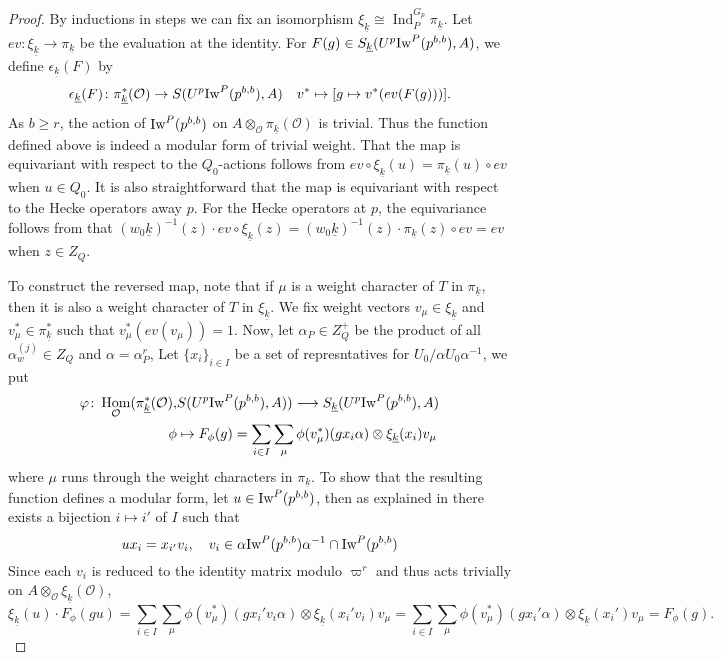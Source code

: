 \documentclass[leqno]{amsart}
\theoremstyle{definition}
\theoremstyle{remark}
\newcommand{\oo}{\mathcal{O}}
\DeclareMathOperator{\Hom}{Hom}
\DeclareMathOperator{\Ind}{Ind}
\newcommand{\wt}[1]{\underline{ #1 }}
\newcommand{\Iw}{\textnormal{Iw}} %
\begin{document}
\begin{proof}
	By inductions in steps
	we can fix an isomorphism 
	$\xi_{\wt{k}}\cong \Ind_{P}^{G_p}\pi_{\wt{k}}$.
	Let $ev\colon \xi_{\wt{k}}\to \pi_{\wt{k}}$
	be the evaluation at the identity.
	For $F(g)\in S_{\wt{k}}(U^p\Iw^P(p^{b,b}),A)$,
	we define 
	$\epsilon_{\wt{k}}(F)$ by
	\begin{equation}\label{eq:wt_indep}
	\epsilon_{\wt{k}}(F)\colon 
	\pi^*_{\wt{k}}(\oo)\rightarrow
	S(U^p\Iw^P(p^{b,b}),A)\quad
	v^*\mapsto [g\mapsto v^*(ev(F(g)))].
	\end{equation}
    As $b\geq r$,
	the action of $\Iw^P(p^{b,b})$ on 
	$A\otimes_{\oo}\pi_{\wt{k}}(\oo)$
	is trivial.
	Thus the function defined above is indeed 
	a modular form
	of trivial weight.
	That the map is equivariant with respect
    to the $Q_0$-actions
    follows from $ev\circ \xi_{\wt{k}}(u)=\pi_{\wt{k}}(u)\circ ev$
    when $u\in Q_0$.
    It is also straightforward that the map
    is equivariant with respect to the Hecke operators away $p$.
	For the Hecke operators at $p$,
    the equivariance follows from that 
    $(w_0\wt{k})^{-1}(z)\cdot ev\circ \xi_{\wt{k}}(z)=
    (w_0\wt{k})^{-1}(z)\cdot \pi_{\wt{k}}(z)\circ ev=
    ev$ when $z\in Z_Q$.


	To construct the reversed map,
	note that if $\mu$ is a weight character of $T$ in  
	$\pi_{\wt{k}}$, then it is also a weight character 
	of $T$ in $\xi_{\wt{k}}$.
	We fix weight vectors $v_\mu\in \xi_{\wt{k}}$
	and $v^*_\mu\in \pi_{\wt{k}}^*$
	such that $v^*_{\mu}(ev(v_\mu))=1$.
	Now, let $\alpha_P\in Z_Q^+$ be the product
	of all $\alpha_w^{(j)}\in Z_Q$ and $\alpha=\alpha_P^r$,
	Let $\{x_i\}_{i\in I}$
	be a set of represntatives 
	for $U_0/\alpha U_0\alpha^{-1}$,
	we put 
	\begin{align*}
		\varphi\colon 
		\Hom_{\oo}(\pi_{\wt{k}}^*(\oo),&
		S(U^p\Iw^P(p^{b,b}),A))\longrightarrow
		S_{\wt{k}}(U^p\Iw^P(p^{b,b}),A)\\
		\phi&\mapsto 
		F_\phi(g)=\sum_{i\in I} \sum_{\mu}
		\phi(v^*_\mu)(gx_i\alpha)\otimes
		\xi_{\wt{k}}(x_i) v_\mu
	\end{align*}
	where $\mu$ runs through the weight characters in 
	$\pi_{\wt{k}}$.
	To show that the resulting function 
	defines a modular form,
	let $u\in \Iw^P(p^{b,b})$, 
	then as explained in \cite[Prop 2.22]{ger}
	there exists a bijection $i\mapsto i'$ of $I$
	such that 
	 \[
		ux_i=x_{i'}v_i,\quad
		v_i\in\alpha\Iw^P(p^{b,b})\alpha^{-1} 
		\cap \Iw^P(p^{b,b})
	\]
	Since each $v_i$ is reduced to the identity matrix 
	modulo $\varpi^r$ and thus acts trivially on 
	$A\otimes_{\oo}\xi_{\wt{k}}(\oo)$,
	\[
		\xi_{\wt{k}}(u)\cdot F_\phi(gu)=
		\sum_{i\in I}\sum_{\mu}
		\phi(v^*_\mu)(gx_i'v_i\alpha)\otimes
		\xi_{\wt{k}}(x_i'v_i) v_\mu=
		\sum_{i\in I}\sum_{\mu}
		\phi(v^*_\mu)(gx_i'\alpha)\otimes
		\xi_{\wt{k}}(x_i')
        v_\mu=F_\phi(g).
	\]


\end{proof}
\end{document}
